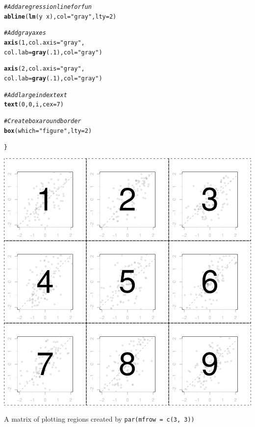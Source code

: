 \documentclass{tufte-book}\usepackage[]{graphicx}\usepackage[]{color}
\makeatletter
\def\maxwidth{ %
  \ifdim\Gin@nat@width>\linewidth
    \linewidth
  \else
    \Gin@nat@width
  \fi
}
\newcommand{\hlnum}[1]{\textcolor[rgb]{0.686,0.059,0.569}{#1}}%
\newcommand{\hlstr}[1]{\textcolor[rgb]{0.192,0.494,0.8}{#1}}%
\newcommand{\hlcom}[1]{\textcolor[rgb]{0.678,0.584,0.686}{\textit{#1}}}%
\newcommand{\hlopt}[1]{\textcolor[rgb]{0,0,0}{#1}}%
\newcommand{\hlstd}[1]{\textcolor[rgb]{0.345,0.345,0.345}{#1}}%
\newcommand{\hlkwc}[1]{\textcolor[rgb]{0.333,0.667,0.333}{#1}}%
\newcommand{\hlkwd}[1]{\textcolor[rgb]{0.737,0.353,0.396}{\textbf{#1}}}%
\newenvironment{kframe}{%
 \def\at@end@of@kframe{}%
 \ifinner\ifhmode%
  \def\at@end@of@kframe{\end{minipage}}%
  \begin{minipage}{\columnwidth}%
 \fi\fi%
 \def\FrameCommand##1{\hskip\@totalleftmargin \hskip-\fboxsep
 \colorbox{shadecolor}{##1}\hskip-\fboxsep
     \hskip-\linewidth \hskip-\@totalleftmargin \hskip\columnwidth}%
 \MakeFramed {\advance\hsize-\width
   \@totalleftmargin\z@ \linewidth\hsize
   \@setminipage}}%
 {\par\unskip\endMakeFramed%
 \at@end@of@kframe}
\newenvironment{knitrout}{}{} %
\makeatother
\begin{document}
\begin{footnotesize}
\begin{marginfigure}
\begin{tiny}
\begin{knitrout}
\begin{kframe}
\begin{alltt}
\hlcom{# Add a regression line for fun}
\hlkwd{abline}\hlstd{(}\hlkwd{lm}\hlstd{(y} \hlopt{~} \hlstd{x),} \hlkwc{col} \hlstd{=} \hlstr{"gray"}\hlstd{,} \hlkwc{lty} \hlstd{=} \hlnum{2}\hlstd{)}


\hlcom{# Add gray axes}
\hlkwd{axis}\hlstd{(}\hlnum{1}\hlstd{,} \hlkwc{col.axis} \hlstd{=} \hlstr{"gray"}\hlstd{,}
     \hlkwc{col.lab} \hlstd{=} \hlkwd{gray}\hlstd{(}\hlnum{.1}\hlstd{),} \hlkwc{col} \hlstd{=} \hlstr{"gray"}\hlstd{)}

\hlkwd{axis}\hlstd{(}\hlnum{2}\hlstd{,} \hlkwc{col.axis} \hlstd{=} \hlstr{"gray"}\hlstd{,}
     \hlkwc{col.lab} \hlstd{=} \hlkwd{gray}\hlstd{(}\hlnum{.1}\hlstd{),} \hlkwc{col} \hlstd{=} \hlstr{"gray"}\hlstd{)}

\hlcom{# Add large index text}
\hlkwd{text}\hlstd{(}\hlnum{0}\hlstd{,} \hlnum{0}\hlstd{, i,} \hlkwc{cex} \hlstd{=} \hlnum{7}\hlstd{)}

\hlcom{# Create box around border}
\hlkwd{box}\hlstd{(}\hlkwc{which} \hlstd{=} \hlstr{"figure"}\hlstd{,} \hlkwc{lty} \hlstd{=} \hlnum{2}\hlstd{)}

\hlstd{\}}
\end{alltt}
\end{kframe}
\includegraphics[width=\maxwidth]{figure/unnamed-chunk-177-1} 

\end{knitrout}
\end{tiny}
\caption{A matrix of plotting regions created by \texttt{par(mfrow = c(3, 3))}}
\label{fig:mfrow}
\end{marginfigure}



\end{footnotesize}
\end{document}
